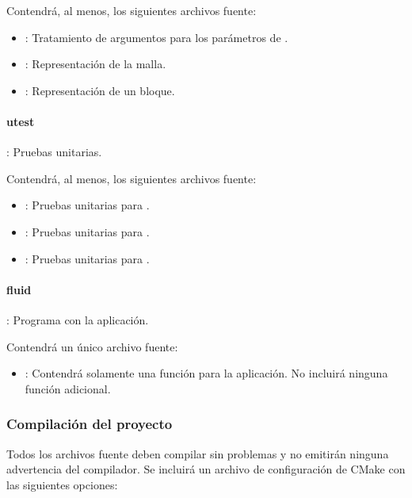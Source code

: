 Contendrá, al menos, los siguientes archivos fuente:
\begin{itemize}
  \item {}: 
        Tratamiento de argumentos para los parámetros de .
  \item {}: 
        Representación de la malla.
  \item {}: 
        Representación de un bloque.
\end{itemize}

\paragraph{utest}: Pruebas unitarias.

Contendrá, al menos, los siguientes archivos fuente:
\begin{itemize}
  \item {}: 
        Pruebas unitarias para .
  \item {}:
        Pruebas unitarias para .
  \item {}:
        Pruebas unitarias para .
\end{itemize}

\paragraph{fluid}: Programa con la aplicación.

Contendrá un único archivo fuente:
\begin{itemize}
  \item {}: 
        Contendrá solamente una función  para la aplicación.
        No incluirá ninguna función adicional.
\end{itemize}

\subsubsection{Compilación del proyecto}

Todos los archivos fuente deben compilar sin problemas y no emitirán ninguna
advertencia del compilador. Se incluirá un archivo de configuración de CMake
con las siguientes opciones:



